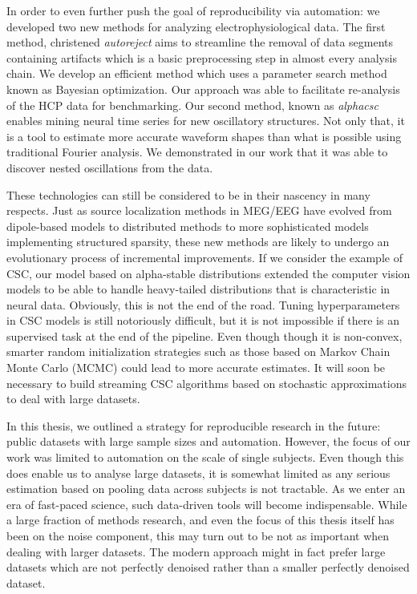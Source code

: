 In order to even further push the goal of reproducibility via automation: we developed two new methods for analyzing electrophysiological data. The first method, christened \emph{autoreject} aims to streamline the removal of data segments containing artifacts which is a basic preprocessing step in almost every analysis chain. We develop an efficient method which uses a parameter search method known as Bayesian optimization. Our approach was able to facilitate re-analysis of the \ac{HCP} data for benchmarking. Our second method, known as \emph{alphacsc} enables mining neural time series for new oscillatory structures. Not only that, it is a tool to estimate more accurate waveform shapes than what is possible using traditional Fourier analysis. We demonstrated in our work that it was able to discover nested oscillations from the data.

These technologies can still be considered to be in their nascency in many respects. Just as source localization methods in \ac{MEG}/\ac{EEG} have evolved from dipole-based models to distributed methods to more sophisticated models implementing structured sparsity, these new methods are likely to undergo an evolutionary process of incremental improvements. If we consider the example of \ac{CSC}, our model based on alpha-stable distributions extended the computer vision models to be able to handle heavy-tailed distributions that is characteristic in neural data. Obviously, this is not the end of the road. Tuning hyperparameters in \ac{CSC} models is still notoriously difficult, but it is not impossible if there is an supervised task at the end of the pipeline. Even though though it is non-convex, smarter random initialization strategies such as those based on Markov Chain Monte Carlo (MCMC) could lead to more accurate estimates. It will soon be necessary to build streaming \ac{CSC} algorithms based on stochastic approximations to deal with large datasets.

In this thesis, we outlined a strategy for reproducible research in the future: public datasets with large sample sizes and automation. However, the focus of our work was limited to automation on the scale of single subjects. Even though this does enable us to analyse large datasets, it is somewhat limited as any serious estimation based on pooling data across subjects is not tractable. As we enter an era of fast-paced science, such data-driven tools will become indispensable. While a large fraction of methods research, and even the focus of this thesis itself has been on the noise component, this may turn out to be not as important when dealing with larger datasets. The modern approach might in fact prefer large datasets which are not perfectly denoised rather than a smaller perfectly denoised dataset. 

